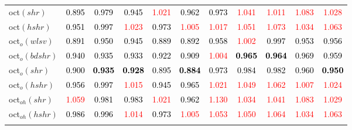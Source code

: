 \begin{tabular}[t]{l|>{}cccc>{}c|ccccc}
oct$(shr)$ & \textcolor{black}{0.895} & \textcolor{black}{0.979} & \textcolor{black}{0.945} & \textcolor{red}{1.021} & \textcolor{black}{0.962} & \textcolor{black}{0.973} & \textcolor{red}{1.041} & \textcolor{red}{1.011} & \textcolor{red}{1.083} & \textcolor{red}{1.028}\\
oct$(hshr)$ & \textcolor{black}{0.951} & \textcolor{black}{0.997} & \textcolor{red}{1.023} & \textcolor{black}{0.973} & \textcolor{red}{1.005} & \textcolor{red}{1.017} & \textcolor{red}{1.051} & \textcolor{red}{1.073} & \textcolor{red}{1.034} & \textcolor{red}{1.063}\\
oct$_o(wlsv)$ & \textcolor{black}{0.891} & \textcolor{black}{0.950} & \textcolor{black}{0.945} & \textcolor{black}{0.889} & \textcolor{black}{0.892} & \textcolor{black}{0.958} & \textcolor{red}{1.002} & \textcolor{black}{0.997} & \textcolor{black}{0.953} & \textcolor{black}{0.956}\\
oct$_o(bdshr)$ & \textcolor{black}{0.940} & \textcolor{black}{0.935} & \textcolor{black}{0.933} & \textcolor{black}{0.922} & \textcolor{black}{0.909} & \textcolor{red}{1.004} & \textcolor{black}{\textbf{0.965}} & \textcolor{black}{\textbf{0.964}} & \textcolor{black}{0.969} & \textcolor{black}{0.959}\\
oct$_o(shr)$ & \textcolor{black}{0.900} & \textcolor{black}{\textbf{0.935}} & \textcolor{black}{\textbf{0.928}} & \textcolor{black}{0.895} & \textcolor{black}{\textbf{0.884}} & \textcolor{black}{0.973} & \textcolor{black}{0.984} & \textcolor{black}{0.982} & \textcolor{black}{0.960} & \textcolor{black}{\textbf{0.950}}\\
oct$_o(hshr)$ & \textcolor{black}{0.956} & \textcolor{black}{0.997} & \textcolor{red}{1.015} & \textcolor{black}{0.945} & \textcolor{black}{0.965} & \textcolor{red}{1.021} & \textcolor{red}{1.049} & \textcolor{red}{1.062} & \textcolor{red}{1.007} & \textcolor{red}{1.024}\\
oct$_{oh}(shr)$ & \textcolor{red}{1.059} & \textcolor{black}{0.981} & \textcolor{black}{0.983} & \textcolor{red}{1.021} & \textcolor{black}{0.962} & \textcolor{red}{1.130} & \textcolor{red}{1.034} & \textcolor{red}{1.041} & \textcolor{red}{1.083} & \textcolor{red}{1.029}\\
oct$_{oh}(hshr)$ & \textcolor{black}{0.986} & \textcolor{black}{0.996} & \textcolor{red}{1.014} & \textcolor{black}{0.973} & \textcolor{red}{1.005} & \textcolor{red}{1.053} & \textcolor{red}{1.050} & \textcolor{red}{1.064} & \textcolor{red}{1.034} & \textcolor{red}{1.063}\\
\addlinespace[0.3em]

\end{tabular}
